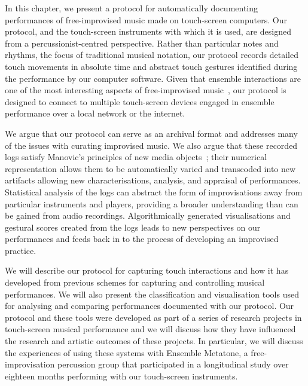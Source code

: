 \documentclass[graybox]{svmult}
\begin{document}
In this chapter, we present a protocol for automatically documenting
performances of free-improvised music made on touch-screen computers.
Our protocol, and the touch-screen instruments with which it is used,
are designed from a percussionist-centred perspective. Rather than
particular notes and rhythms, the focus of traditional musical
notation, our protocol records detailed touch movements in absolute
time and abstract touch gestures identified during the performance by
our computer software. Given that ensemble interactions are one of the
most interesting aspects of free-improvised music~\cite{Borgo:2006fv},
our protocol is designed to connect to multiple touch-screen devices
engaged in ensemble performance over a local network or the internet.

We argue that our protocol can serve as an archival format and
addresses many of the issues with curating improvised music. We also
argue that these recorded logs satisfy Manovic's principles of new
media objects~\cite{Manovich:2002ly}; their numerical representation
allows them to be automatically varied and transcoded into new
artifacts allowing new characterisations, analysis, and appraisal of
performances. Statistical analysis of the logs can abstract the form
of improvisations away from particular instruments and players,
providing a broader understanding than can be gained from audio
recordings. Algorithmically generated visualisations and gestural
scores created from the logs leads to new perspectives on our
performances and feeds back in to the process of developing an
improvised practice.

We will describe our protocol for capturing touch interactions and how
it has developed from previous schemes for capturing and controlling
musical performances. We will also present the classification and
visualisation tools used for analysing and comparing performances
documented with our protocol. Our protocol and these tools were
developed as part of a series of research projects in touch-screen
musical performance and we will discuss how they have influenced the
research and artistic outcomes of these projects. In particular, we
will discuss the experiences of using these systems with Ensemble
Metatone, a free-improvisation percussion group that participated in a
longitudinal study over eighteen months performing with our
touch-screen instruments.

\end{document}
